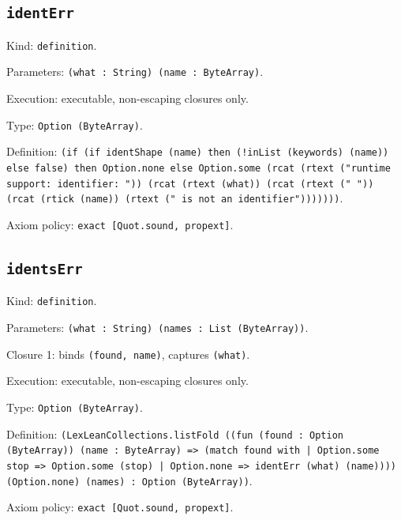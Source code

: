 \documentclass[11pt]{article}
\begin{document}
\subsection*{\texttt{identErr}}
\noindent Kind: \texttt{definition}.\par
\noindent Parameters: \texttt{(what : String) (name : ByteArray)}.\par
\noindent Execution: executable, non-escaping closures only.\par
\noindent Type: \texttt{Option (ByteArray)}.\par
\noindent Definition: \texttt{(if (if identShape (name) then (!inList (keywords) (name)) else false) then Option.none else Option.some (rcat (rtext ("runtime support: identifier: ")) (rcat (rtext (what)) (rcat (rtext (" ")) (rcat (rtick (name)) (rtext (" is not an identifier")))))))}.\par
\noindent Axiom policy: \texttt{exact [Quot.sound, propext]}.\par
\subsection*{\texttt{identsErr}}
\noindent Kind: \texttt{definition}.\par
\noindent Parameters: \texttt{(what : String) (names : List (ByteArray))}.\par
\noindent Closure 1: binds \texttt{(found, name)}, captures \texttt{(what)}.\par
\noindent Execution: executable, non-escaping closures only.\par
\noindent Type: \texttt{Option (ByteArray)}.\par
\noindent Definition: \texttt{(LexLeanCollections.listFold ((fun (found : Option (ByteArray)) (name : ByteArray) => (match found with | Option.some stop => Option.some (stop) | Option.none => identErr (what) (name)))) (Option.none) (names) : Option (ByteArray))}.\par
\noindent Axiom policy: \texttt{exact [Quot.sound, propext]}.\par
\end{document}
